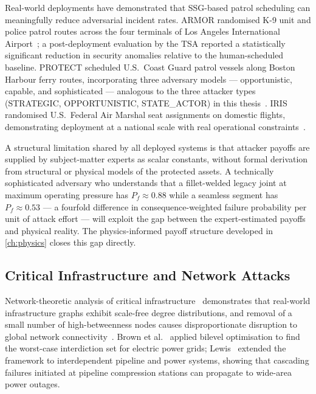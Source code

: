 Real-world deployments have demonstrated that SSG-based patrol scheduling
can meaningfully reduce adversarial incident rates.  ARMOR randomised
K-9 unit and police patrol routes across the four terminals of Los Angeles
International Airport~\cite{An2013}; a post-deployment evaluation by the
\ac{TSA} reported a statistically significant reduction in security
anomalies relative to the human-scheduled baseline.  PROTECT scheduled
U.S.\ Coast Guard patrol vessels along Boston Harbour ferry routes,
incorporating three adversary models — opportunistic, capable, and
sophisticated — analogous to the three attacker types (STRATEGIC,
OPPORTUNISTIC, STATE\_ACTOR) in this thesis~\cite{Tambe2011}.  IRIS
randomised U.S.\ Federal Air Marshal seat assignments on domestic flights,
demonstrating deployment at a national scale with real operational constraints~\cite{Tambe2011}.

A structural limitation shared by all deployed systems is that attacker
payoffs are supplied by subject-matter experts as scalar constants,
without formal derivation from structural or physical models of the
protected assets.  A technically sophisticated adversary who understands
that a fillet-welded legacy joint at maximum operating pressure has
$P_f \approx \num{0.88}$ while a seamless segment has $P_f \approx
\num{0.53}$ — a fourfold difference in consequence-weighted failure
probability per unit of attack effort — will exploit the gap between
the expert-estimated payoffs and physical reality.  The physics-informed
payoff structure developed in \cref{ch:physics} closes this gap directly.

\subsection{Critical Infrastructure and Network Attacks}
\label{subsec:lit_ci}

Network-theoretic analysis of critical infrastructure~\cite{Newman2010,
Albert2000} demonstrates that real-world infrastructure graphs exhibit
scale-free degree distributions, and removal of a small number of
high-betweenness nodes causes disproportionate disruption to global
network connectivity~\cite{Albert2000}.  Brown et al.~\cite{Brown2006}
applied bilevel optimisation to find the worst-case interdiction set for
electric power grids; Lewis~\cite{Lewis2014} extended the framework to
interdependent pipeline and power systems, showing that cascading failures
initiated at pipeline compression stations can propagate to wide-area
power outages.

